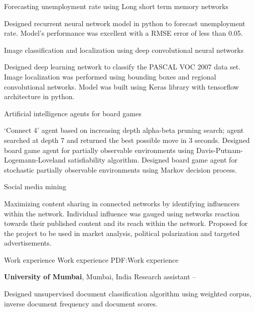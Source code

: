 \documentclass[a4paper]{simpleresumecv}
\begin{document}
\begin{Body}
Forecasting unemployment rate using Long short term memory networks
\begin{Detail}
\SubBulletItem
Designed recurrent neural network model in python to forecast unemployment rate. Model's performance was excellent with a RMSE error of less than 0.05.
\end{Detail}
\Gap

Image classification and localization using deep convolutional neural networks 
\begin{Detail}
\SubBulletItem
Designed deep learning network to classify the PASCAL VOC 2007 data set. Image localization was performed using bounding boxes and regional convolutional networks.
\SubBulletItem
Model was built using Keras library with tensorflow architecture in python.
\end{Detail}
\Gap

Artificial intelligence agents for board games
\begin{Detail}
\SubBulletItem
`Connect 4' agent based on increasing depth alpha-beta pruning search; agent searched at depth 7 and returned the best possible move in 3 seconds.
\SubBulletItem
Designed board game agent for partially observable environments using Davis-Putnam-Logemann-Loveland satisfiability algorithm.
\SubBulletItem
Designed board game agent for stochastic partially observable environments using Markov decision process. 
\end{Detail}
\Gap

Social media mining
\begin{Detail}
\SubBulletItem
Maximizing content sharing in connected networks by identifying influencers within the network.
\SubBulletItem
Individual influence was gauged using networks reaction towards their published content and its reach within the network.
\SubBulletItem
Proposed for the project to be used in market analysis, political polarization and targeted advertisements.
\end{Detail}
\Gap



\Section
{Work experience}
{Work experience}
{PDF:Work experience}

{\textbf{University of Mumbai}}, Mumbai, India
\Gap
Research assistant
\hfill
{} --
\begin{Detail}
\Item
Designed unsupervised document classification algorithm using weighted corpus, inverse document frequency and document scores.
\end{Detail}


\end{Body}
\end{document}
